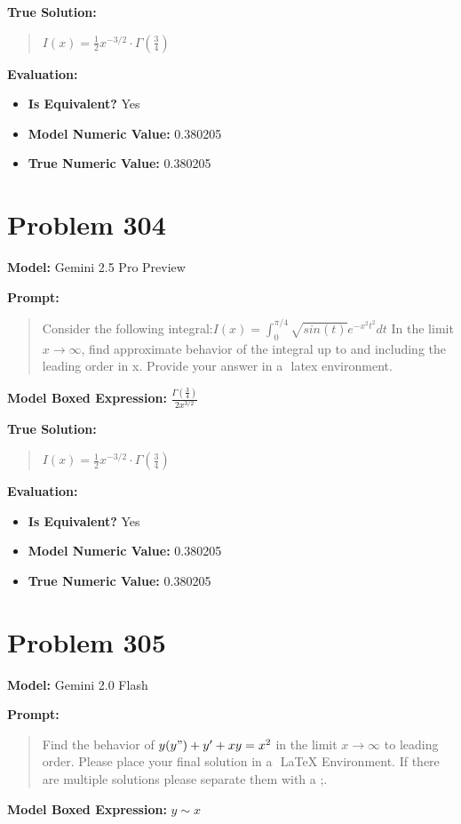 \documentclass{article}
\begin{document}
{\textbf{True Solution:}
\begin{quote}
$I(x) = \frac{1}{2}x^{-3/2}\cdot\Gamma(\frac{3}{4})$
\end{quote}

\textbf{Evaluation:}
\begin{itemize}
\item \textbf{Is Equivalent?} Yes
\item \textbf{Model Numeric Value:} 0.380205
\item \textbf{True Numeric Value:} 0.380205
\end{itemize}
\vspace{1cm}
\section*{Problem 304}
\textbf{Model:} Gemini 2.5 Pro Preview

\textbf{Prompt:}
\begin{quote}
Consider the following integral:$I(x) = \int_0^{π/4}\sqrt{sin (t)}e^{-x^2t^2}dt$ In the limit$x \rightarrow \infty$, find approximate behavior of the integral up to and including the leading order in x. Provide your answer in a $\boxed{}$ latex environment.
\end{quote}
\textbf{Model Boxed Expression:} $\frac{\Gamma\left(\frac{3}{4}\right)}{2x^{3/2}}$

\textbf{True Solution:}
\begin{quote}
$I(x) = \frac{1}{2}x^{-3/2}\cdot\Gamma(\frac{3}{4})$
\end{quote}

\textbf{Evaluation:}
\begin{itemize}
\item \textbf{Is Equivalent?} Yes
\item \textbf{Model Numeric Value:} 0.380205
\item \textbf{True Numeric Value:} 0.380205
\end{itemize}
\vspace{1cm}
\section*{Problem 305}
\textbf{Model:} Gemini 2.0 Flash

\textbf{Prompt:}
\begin{quote}
Find the behavior of $y(y") + y' + xy = x^2$ in the limit $ x \rightarrow \infty$ to leading order. Please place your final solution in a $\boxed{}$ LaTeX Environment. If there are multiple solutions please separate them with a ;.
\end{quote}
\textbf{Model Boxed Expression:} $y \sim x$

}
\end{document}
